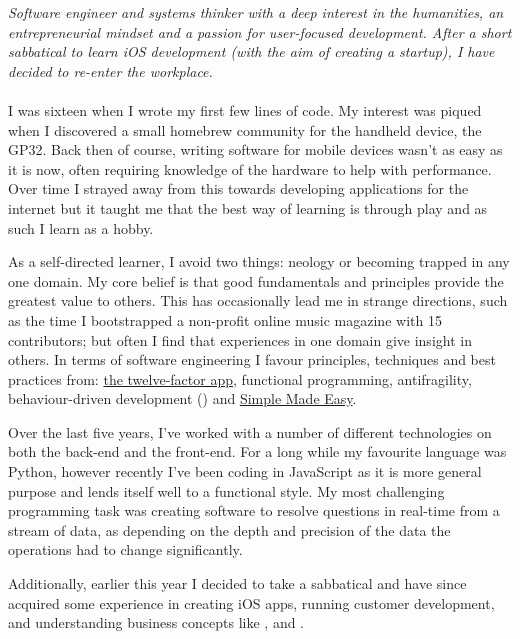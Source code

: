 \documentclass[10pt,a4paper]{article}
\begin{document}
\vspace{-1.3em}  %
\begin{multicols}{2}  %
\noindent \emph{Software engineer and systems thinker with a deep interest in the humanities, an entrepreneurial mindset and a passion for user-focused development. After a short sabbatical to learn iOS development (with the aim of creating a startup), I have decided to re-enter the workplace.}
\\
\\
I was sixteen when I wrote my first few lines of code. My interest was piqued when I discovered a small homebrew community for the handheld device, the GP32. Back then of course, writing software for mobile devices wasn't as easy as it is now, often requiring knowledge of the hardware to help with performance. Over time I strayed away from this towards developing applications for the internet but it taught me that the best way of learning is through play and as such I learn as a hobby.\newline

As a self-directed learner, I avoid two things: neology or becoming trapped in any one domain. My core belief is that good fundamentals and principles provide the greatest value to others. This has occasionally lead me in strange directions, such as the time I bootstrapped a non-profit online music magazine with 15 contributors; but often I find that experiences in one domain give insight in others. In terms of software engineering I favour principles, techniques and best practices from: \href{http://12factor.net}{the twelve-factor app}, functional programming, antifragility, behaviour-driven development () and \href{http://infoq.com/presentations/Simple-Made-Easy}{Simple Made Easy}.\newline

Over the last five years, I've worked with a number of different technologies on both the back-end and the front-end. For a long while my favourite language was Python, however recently I've been coding in JavaScript as it is more general purpose and lends itself well to a functional style. My most challenging programming task was creating software to resolve questions in real-time from a stream of data, as depending on the depth and precision of the data the operations had to change significantly.\newline

Additionally, earlier this year I decided to take a sabbatical and have since acquired some experience in creating iOS apps, running customer development, and understanding business concepts like ,  and . 

\end{multicols}
\end{document}
